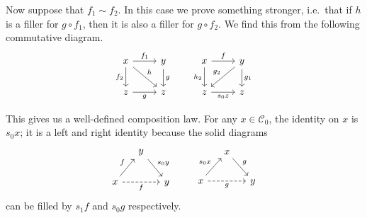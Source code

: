 \documentclass[main.tex]{subfiles}
\begin{document}
\begin{definition}
\begin{itemize}
      Now suppose that $f_{1} \sim f_{2}$. In this case we prove something stronger, i.e.\ that if $h$ is a filler for $g \circ f_{1}$, then it is also a filler for $g \circ f_{2}$. We find this from the following commutative diagram.
      \begin{equation*}
        \begin{tikzcd}
          x
          \arrow[r, "f_{1}"]
          \arrow[d, swap, "f_{2}"]
          \arrow[dr, "h"]
          & y
          \arrow[d, "g"]
          \\
          z
          \arrow[r, swap, "g"]
          & z
        \end{tikzcd}
        \qquad
        \begin{tikzcd}
          x
          \arrow[r, "f"]
          \arrow[d, swap, "h_{2}"]
          & y
          \arrow[d, "g_{1}"]
          \arrow[dl, swap, "g_{2}"]
          \\
          z
          \arrow[r, swap, "s_{0}z"]
          & z
        \end{tikzcd}
      \end{equation*}

      This gives us a well-defined composition law. For any $x \in \mathcal{C}_{0}$, the identity on $x$ is $s_{0}x$; it is a left and right identity because the solid diagrams
      \begin{equation*}
        \begin{tikzcd}[column sep=small]
          & y
          \arrow[dr, "s_{0}y"]
          \\
          x
          \arrow[rr, dashed, swap, "f"]
          \arrow[ur, "f"]
          && y
        \end{tikzcd}
        \qquad
        \begin{tikzcd}[column sep=small]
          & x
          \arrow[dr, "g"]
          \\
          x
          \arrow[ur, "s_{0}x"]
          \arrow[rr, swap, dashed, "g"]
          && y
        \end{tikzcd}
      \end{equation*}
      can be filled by $s_{1}f$ and $s_{0}g$ respectively.


\end{itemize}
\end{definition}
\end{document}
